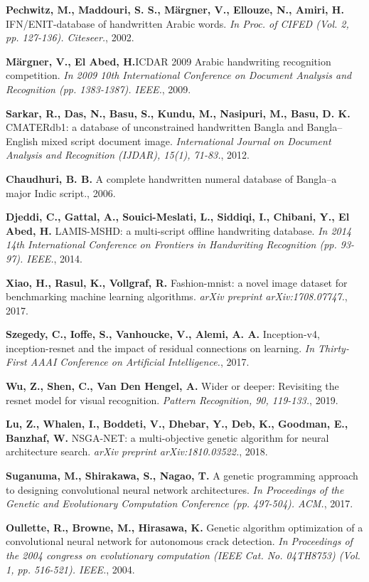 \documentclass[eng]{simposium}
\begin{document}
\begin{thebibliography}{99}
\textbf{Pechwitz, M., Maddouri, S. S., Märgner, V., Ellouze, N., Amiri, H.} IFN/ENIT-database of handwritten Arabic words. \emph{In Proc. of CIFED (Vol. 2, pp. 127-136). Citeseer.}, 2002.

\textbf{Märgner, V., El Abed, H.}ICDAR 2009 Arabic handwriting recognition competition. \emph{In 2009 10th International Conference on Document Analysis and Recognition (pp. 1383-1387). IEEE.}, 2009.

\textbf{Sarkar, R., Das, N., Basu, S., Kundu, M., Nasipuri, M., Basu, D. K.} CMATERdb1: a database of unconstrained handwritten Bangla and Bangla–English mixed script document image. \emph{International Journal on Document Analysis and Recognition (IJDAR), 15(1), 71-83.}, 2012.

\textbf{Chaudhuri, B. B.} A complete handwritten numeral database of Bangla–a major Indic script., 2006.

\textbf{Djeddi, C., Gattal, A., Souici-Meslati, L., Siddiqi, I., Chibani, Y., El Abed, H.} LAMIS-MSHD: a multi-script offline handwriting database. \emph{In 2014 14th International Conference on Frontiers in Handwriting Recognition (pp. 93-97). IEEE.}, 2014.

\textbf{Xiao, H., Rasul, K., Vollgraf, R.} Fashion-mnist: a novel image dataset for benchmarking machine learning algorithms. \emph{arXiv preprint arXiv:1708.07747.}, 2017.

\textbf{Szegedy, C., Ioffe, S., Vanhoucke, V., Alemi, A. A.} Inception-v4, inception-resnet and the impact of residual connections on learning. \emph{In Thirty-First AAAI Conference on Artificial Intelligence.}, 2017.

\textbf{Wu, Z., Shen, C., Van Den Hengel, A.} Wider or deeper: Revisiting the resnet model for visual recognition. \emph{Pattern Recognition, 90, 119-133.}, 2019.

\textbf{Lu, Z., Whalen, I., Boddeti, V., Dhebar, Y., Deb, K., Goodman, E., Banzhaf, W.} NSGA-NET: a multi-objective genetic algorithm for neural architecture search. \emph{arXiv preprint arXiv:1810.03522.}, 2018.

\textbf{Suganuma, M., Shirakawa, S., Nagao, T.} A genetic programming approach to designing convolutional neural network architectures. \emph{In Proceedings of the Genetic and Evolutionary Computation Conference (pp. 497-504). ACM.}, 2017.

\textbf{Oullette, R., Browne, M., Hirasawa, K.} Genetic algorithm optimization of a convolutional neural network for autonomous crack detection. \emph{In Proceedings of the 2004 congress on evolutionary computation (IEEE Cat. No. 04TH8753) (Vol. 1, pp. 516-521). IEEE.}, 2004.

\end{thebibliography}
\end{document}
